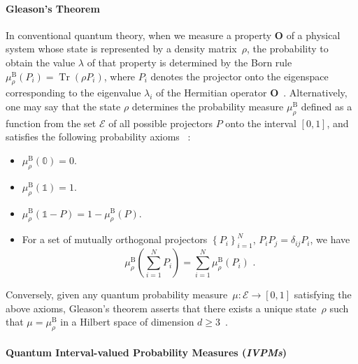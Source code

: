 \documentclass[english,reprint, aps, prl,superscriptaddress, showpacs,
showkeys, longbibliography, amsmath, amssymb]{revtex4-1}
\theoremstyle{plain}
\theoremstyle{definition}
\newcommand{\events}{\ensuremath{\mathcal{E}}}
\newcommand{\Tr}{\mathop{\mathrm{Tr}}\nolimits}
\begin{document}
\paragraph{Gleason's Theorem}

In conventional quantum theory, when we measure a property $\mathbf{O}$
of a physical system whose state is represented by a density matrix~$\rho$,
the probability to obtain the value $\lambda$ of that property is
determined by the Born rule $\mu_{\rho}^{\mathrm{B}}\left(P_{i}\right)=\Tr\left(\rho P_{i}\right)$,
where $P_{i}$ denotes the projector onto the eigenspace corresponding
to the eigenvalue $\lambda_{i}$ of the Hermitian operator $\mathbf{O}$~\cite{Born1983,peres1995quantum,544199,Jaeger2007}.
Alternatively, one may say that the state $\rho$ determines the probability
measure $\mu_{\rho}^{\mathrm{B}}$ defined as a function from the
set $\events$ of all possible projectors $P$ onto the interval $[0,1]$,
and satisfies the following probability axioms~ \cite{10.2307/2308516,gleason1957,Redhead1987-REDINA,Maassen2010}: 
\begin{itemize}
\item $\mu_{\rho}^{\mathrm{B}}(\mathbb{0})=0$. 
\item $\mu_{\rho}^{\mathrm{B}}(\mathbb{1})=1$. 
\item $\mu_{\rho}^{\mathrm{B}}\left(\mathbb{1}-P\right)=
1-\mu_{\rho}^{\mathrm{B}}\left(P\right)$. 
\item For a set of mutually orthogonal projectors $\left\{ P_{i}\right\} _{i=1}^{N}$,
$P_iP_j=\delta_{ij}P_i$,
we have 
\begin{equation}
\mu_{\rho}^{\mathrm{B}}\left(\sum_{i=1}^{N}P_{i}\right)=
\sum_{i=1}^{N}\mu_{\rho}^{\mathrm{B}}\left(P_{i}\right)
\textrm{ .}\label{eq:QuantumProbability-Addition}
\end{equation}
\end{itemize}
Conversely, given any quantum probability measure~$\mu:\events\rightarrow[0,1]$
satisfying the above axioms, Gleason's theorem asserts that there
exists a unique state~$\rho$ such that $\mu=\mu_{\rho}^{\mathrm{B}}$
in a Hilbert space of dimension $d\geq3$~\cite{gleason1957,Redhead1987-REDINA,peres1995quantum}.

\paragraph{Quantum Interval-valued Probability Measures (\emph{IVPMs})}
\end{document}
